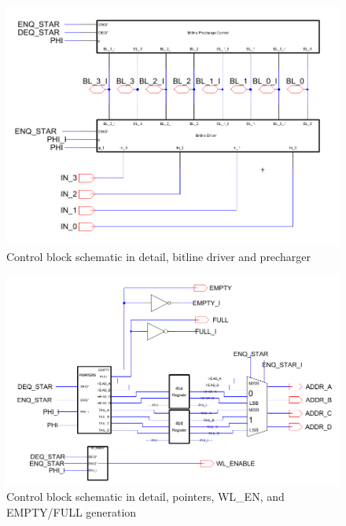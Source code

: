 \documentclass[12pt]{report}
\begin{document}
\begin{figure}[H]
  \centering
    \includegraphics[width=1.0\textwidth]{Schematics/control_block_bitlinedriver_precharger_schematic.PNG}
  \caption{Control block schematic in detail, bitline driver and precharger}
  \label{fig:control_block_bitlinedriver_precharger_schematic}
\end{figure}
\begin{figure}[H]
  \centering
    \includegraphics[width=1.0\textwidth]{Schematics/control_block_pointers_wlen_addrmux_emptyfull_schematic.PNG}
  \caption{Control block schematic in detail, pointers, WL\_EN, and EMPTY/FULL generation}
  \label{fig:control_block_pointers_wlen_addrmux_emptyfull_schematic}
\end{figure}
\end{document}
